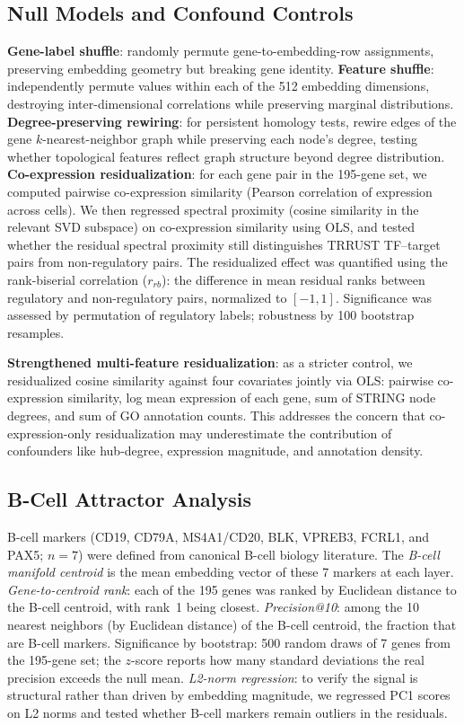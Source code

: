 \documentclass[12pt]{article}
\begin{document}
\subsection{Null Models and Confound Controls}
\textbf{Gene-label shuffle}: randomly permute gene-to-embedding-row assignments, preserving embedding geometry but breaking gene identity.
\textbf{Feature shuffle}: independently permute values within each of the 512 embedding dimensions, destroying inter-dimensional correlations while preserving marginal distributions.
\textbf{Degree-preserving rewiring}: for persistent homology tests, rewire edges of the gene $k$-nearest-neighbor graph while preserving each node's degree, testing whether topological features reflect graph structure beyond degree distribution.
\textbf{Co-expression residualization}: for each gene pair in the 195-gene set, we computed pairwise co-expression similarity (Pearson correlation of expression across cells).
We then regressed spectral proximity (cosine similarity in the relevant SVD subspace) on co-expression similarity using OLS, and tested whether the residual spectral proximity still distinguishes TRRUST TF--target pairs from non-regulatory pairs.
The residualized effect was quantified using the rank-biserial correlation ($r_{rb}$): the difference in mean residual ranks between regulatory and non-regulatory pairs, normalized to $[-1, 1]$.
Significance was assessed by permutation of regulatory labels; robustness by 100 bootstrap resamples.

\textbf{Strengthened multi-feature residualization}: as a stricter control, we residualized cosine similarity against four covariates jointly via OLS: pairwise co-expression similarity, log mean expression of each gene, sum of STRING node degrees, and sum of GO annotation counts.
This addresses the concern that co-expression-only residualization may underestimate the contribution of confounders like hub-degree, expression magnitude, and annotation density.

\subsection{B-Cell Attractor Analysis}
B-cell markers (CD19, CD79A, MS4A1/CD20, BLK, VPREB3, FCRL1, and PAX5; $n = 7$) were defined from canonical B-cell biology literature.
The \emph{B-cell manifold centroid} is the mean embedding vector of these 7 markers at each layer.
\emph{Gene-to-centroid rank}: each of the 195 genes was ranked by Euclidean distance to the B-cell centroid, with rank~1 being closest.
\emph{Precision@10}: among the 10 nearest neighbors (by Euclidean distance) of the B-cell centroid, the fraction that are B-cell markers.
Significance by bootstrap: 500 random draws of 7 genes from the 195-gene set; the $z$-score reports how many standard deviations the real precision exceeds the null mean.
\emph{L2-norm regression}: to verify the signal is structural rather than driven by embedding magnitude, we regressed PC1 scores on L2 norms and tested whether B-cell markers remain outliers in the residuals.
\end{document}
